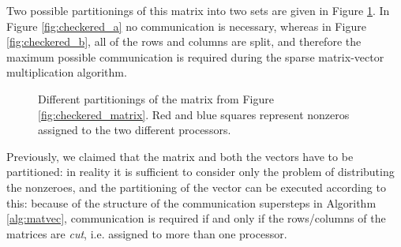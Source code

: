 Two possible partitionings of this matrix into two sets are given in Figure \ref{fig:checkered_partitions}. In Figure \ref{fig:checkered_a} no communication is necessary, whereas in Figure \ref{fig:checkered_b}, all of the rows and columns are split, and therefore the maximum possible communication is required during the sparse matrix-vector multiplication algorithm.

\begin{figure}[h]
	\centering
	\hspace{1cm}
	\caption{Different partitionings of the matrix from Figure \ref{fig:checkered_matrix}. Red and blue squares represent nonzeros assigned to the two different processors.} \label{fig:checkered_partitions}
\end{figure}

Previously, we claimed that the matrix and both the vectors have to be partitioned: in reality it is sufficient to consider only the problem of distributing the nonzeroes, and the partitioning of the vector can be executed according to this: because of the structure of the communication supersteps in Algorithm \ref{alg:matvec}, communication is required if and only if the rows/columns of the matrices are \emph{cut}, i.e. assigned to more than one processor.

